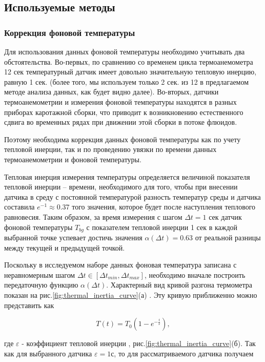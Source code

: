 \subsection{Используемые методы}
\subsubsection{Коррекция фоновой температуры}
\par
Для использования данных фоновой температуры необходимо учитывать два обстоятельства. Во-первых, по сравнению со временем цикла термоанемометра 12 сек температурный датчик имеет довольно значительную тепловую инерцию, равную 1 сек. (более того, мы используем только 2 сек. из 12  в предлагаемом методе анализа данных, как будет видно далее). Во-вторых, датчики термоанемометрии и измерения фоновой температуры находятся в разных приборах каротажной сборки, что приводит к возникновению естественного сдвига во временных рядах при движении этой сборки в потоке флюидов.
\par
Поэтому необходима коррекция данных фоновой температуры как по учету тепловой инерции, так и по проведению увязки по времени данных термоанемометрии и фоновой температуры.
\par
Тепловая инерция измерения температуры определяется \cite{gost} величиной показателя тепловой инерции – времени, необходимого для того, чтобы при внесении датчика в среду с постоянной температурой разность температур среды и датчика составила $e^{-1}\approx0.37$  того значения, которое будет после наступления теплового равновесия. Таким образом, за время измерения с шагом  $\Delta t=1$ сек датчик фоновой температуры $T_{bg}$ с показателем тепловой инерции 1 сек в каждой выбранной точке успевает достичь значения $\alpha(\Delta t)=0.63$ от реальной разницы между текущей и предыдущей точкой.
\par
Поскольку в исследуемом наборе данных фоновая температура записана с неравномерным шагом $\Delta t\in[\Delta t_{min},\Delta t_{max}]$, необходимо вначале построить передаточную функцию $\alpha(\Delta t)$.
Характерный вид кривой разгона термометра показан на рис.\ref{fig:thermal_inertia_curve}(а) \cite{thermal_inertia_patent}. Эту кривую приближенно можно представить как 

\begin{equation}
    T(t) = T_0 \left(1-e^{-\frac{t}{\varepsilon}}\right),
\end{equation}

где $\varepsilon$ - коэффициент тепловой инерции \cite{thermal_inertia_paper}, рис.\ref{fig:thermal_inertia_curve}(б). Так как для выбранного датчика $\varepsilon=1$с, то для рассматриваемого датчика получаем 

